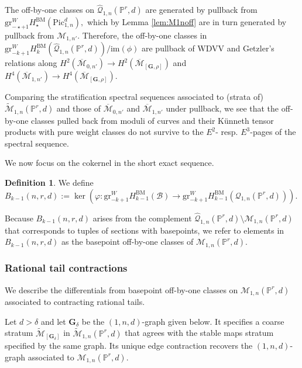 \documentclass[12pt,reqno]{amsart}
\theoremstyle{definition}
\theoremstyle{definition}
\theoremstyle{definition}
\theoremstyle{definition}
\newtheorem{definition}[theorem]{Definition}
\newcommand{\ol}[1]{\overline{#1}}
\newcommand{\PP}{\mathbb{P}}
\newcommand{\Mcal}{\mathcal{M}}
\newcommand{\Mbar}{\ol{\Mcal}}
\newcommand{\Mtil}{\widetilde{\mathcal{M}}}
\newcommand{\gr}{\mathrm{gr}}
\begin{document}
The off-by-one classes on $\hat{\mathcal{Q}}_{1,n}(\PP^r,d)$ are generated by pullback from $\gr^W_{-\star+1}H_\star^{\mathrm{BM}}(\mathrm{Pic}^d_{1,n}),$ which by Lemma \ref{lem:M1noff} are in turn generated by pullback from $\mathcal{M}_{1,n'}.$ Therefore, the off-by-one classes in $\mathrm{gr}^W_{-k+1}H_k^{\mathrm{BM}}(\hat{\mathcal{Q}}_{1,n}(\mathbb{P}^r,d))/\mathrm{im}(\phi)$ are pullback of WDVV and Getzler's relations along $H^2(\Mbar_{0,n'})\to H^2(\Mbar_{[\mathbf{G},\rho]})$ and $H^4(\Mbar_{1,n'})\to H^4(\Mbar_{[\mathbf{G},\rho]}).$ 

Comparing the stratification spectral sequences associated to (strata of) $\Mtil_{1,n}(\PP^r,d)$ and those of $\Mbar_{0,n'}$ and $\Mbar_{1,n'}$ under pullback, we see that the off-by-one classes pulled back from moduli of curves and their Künneth tensor products with pure weight classes do not survive to the $E^2$- resp. $E^3$-pages of the spectral sequence.

We now focus on the cokernel in the short exact sequence.

\begin{definition}
  We define $B_{k-1}(n,r,d):=\ker(\varphi: \gr^W_{-k+1} H^{\mathrm{BM}}_{k-1}(\mathcal{B})\to \gr^W_{-k+1} H_{k-1}^{\mathrm{BM}}(\mathcal{Q}_{1,n}(\mathbb{P}^r,d))).$ 
\end{definition}

Because $B_{k-1}(n,r,d)$ arises from the complement $\hat{\mathcal{Q}}_{1,n}(\PP^r,d)\setminus \mathcal{M}_{1,n}(\PP^r,d)$ that corresponds to tuples of sections with basepoints, we refer to elements in $B_{k-1}(n,r,d)$ as the basepoint off-by-one classes of $\mathcal{M}_{1,n}(\PP^r,d).$

\subsubsection{Rational tail contractions}\label{subsec:ratailcon}

We describe the differentials from basepoint off-by-one classes on $\mathcal{M}_{1,n}(\PP^r,d)$ associated to contracting rational tails.

Let $d>\delta$ and let $\mathbf{G}_{\delta}$ be the $(1,n,d)$-graph given below. It specifies a coarse stratum $\Mtil_{[\mathbf{G}_{\delta}]}$ in $\Mtil_{1,n}(\PP^r,d)$ that agrees with the stable maps stratum specified by the same graph. Its unique edge contraction recovers the $(1,n,d)$-graph associated to $\mathcal{M}_{1,n}(\PP^r,d).$ 
\end{document}
